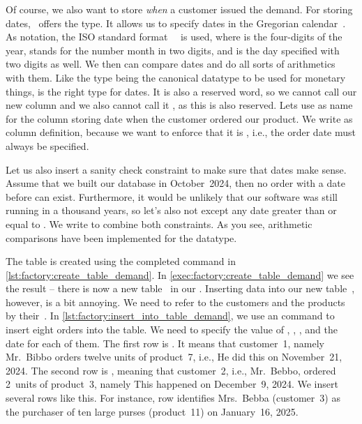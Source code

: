 Of course, we also want to store \emph{when} a customer issued the demand.
For storing dates, \sql\ offers the  type.
It allows us to specify dates in the Gregorian calendar~\cite{PGDG:PD:HU,G1582IG}.
As notation, the ISO standard format~~\cite{ISO860112019} is used, where  is the four-digits of the year,  stands for the number month in two digits, and  is the day specified with two digits as well.
We then can compare dates and do all sorts of arithmetics with them.
Like the type  being the canonical datatype to be used for monetary things,  is the right type for dates.
It is also a reserved word, so we cannot call our new column  and we also cannot call it , as this is also reserved.
Lets use  as name for the column storing date when the customer ordered our product.
We write  as column definition, because we want to enforce that it is , i.e., the order date must always be specified.%
%
\begin{sloppypar}%
Let us also insert a sanity check constraint to make sure that dates make sense.
Assume that we built our database in October~2024, then no order with a date before  can exist.
Furthermore, it would be unlikely that our software was still running in a thousand years, so let's also not except any date greater than or equal to .
We write  to combine both constraints.
As you see, arithmetic comparisons have been implemented for the  datatype.%
\end{sloppypar}%
%
The table is created using the completed command in \cref{lst:factory:create_table_demand}.
In \cref{exec:factory:create_table_demand} we see the result -- there is now a new table~ in our \db.%
%
\endhsection%
%
%
%
%
Inserting data into our new table~, however, is a bit annoying.
We need to refer to the customers and the products by their~.
In \cref{lst:factory:insert_into_table_demand}, we use an  command to insert eight orders into the table.
We need to specify the value of , , , and the  date for each of them.
The first row is .
It means that customer~1, namely Mr.~Bibbo orders twelve units of product~7, i.e., 
He did this on November~21, 2024.
The second row is , meaning that customer~2, i.e., Mr.~Bebbo, ordered 2~units of product~3, namely 
This happened on December~9, 2024.
We insert several rows like this.
For instance, row  identifies Mrs.~Bebba (customer~3) as the purchaser of ten large purses (product~11) on January~16, 2025.

